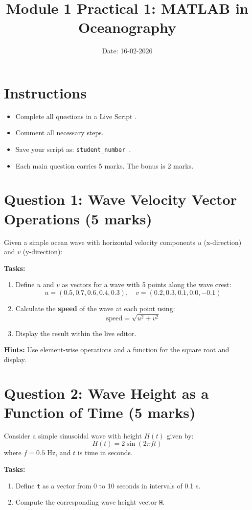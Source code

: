 \documentclass[12pt]{article}
\title{Module 1 Practical 1: MATLAB in Oceanography}
\author{}
\date{Date: 16-02-2026}
\begin{document}
\maketitle

\section*{Instructions}
\begin{itemize}
    \item Complete all questions in a Live Script .
    \item Comment all necessary steps.
    \item Save your script as: \texttt{student\_number }.
    \item Each main question carries 5 marks. The bonus is 2 marks.
\end{itemize}

\section*{Question 1: Wave Velocity Vector Operations (5 marks)}
Given a simple ocean wave with horizontal velocity components $u$ (x-direction) and $v$ (y-direction):

\textbf{Tasks:}
\begin{enumerate}
    \item Define $u$ and $v$ as vectors for a wave with 5 points along the wave crest:
    \[
    u = (0.5, 0.7, 0.6, 0.4, 0.3), \quad
    v = (0.2, 0.3, 0.1, 0.0, -0.1)
    \]
    \item Calculate the \textbf{speed} of the wave at each point using:
    \[
    \text{speed} = \sqrt{u^2 + v^2}
    \]
    \item Display the result within the live editor.
\end{enumerate}

\textbf{Hints:} Use element-wise operations and a function for the square root and display.


\section*{Question 2: Wave Height as a Function of Time (5 marks)}
Consider a simple sinusoidal wave with height $H(t)$ given by:
\[
H(t) = 2 \sin(2 \pi f t)
\]
where $f = 0.5$ Hz, and $t$ is time in seconds.

\textbf{Tasks:}
\begin{enumerate}
    \item Define \texttt{t} as a vector from 0 to 10 seconds in intervals of 0.1 s.
    \item Compute the corresponding wave height vector \texttt{H}.
\end{enumerate}
\end{document}
